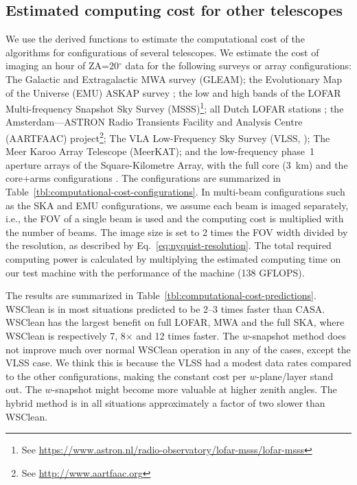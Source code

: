 \documentclass[useAMS,usenatbib]{mn2e}
\newcommand{\degree}{\ensuremath{^{\circ}}\xspace}
\begin{document}
\subsection{Estimated computing cost for other telescopes} \label{sec:application-to-nonmwa}
We use the derived functions to estimate the computational cost of the algorithms for configurations of several telescopes. We estimate the cost of imaging an hour of ZA=20\degree data for the following surveys or array configurations: The Galactic and Extragalactic MWA survey (GLEAM); the Evolutionary Map of the Universe (EMU) ASKAP survey \citep{emu-norris-2011}; the low and high bands of the LOFAR Multi-frequency Snapshot Sky Survey (MSSS)\footnote{See \url{https://www.astron.nl/radio-observatory/lofar-msss/lofar-msss}}; all Dutch LOFAR stations \citep{lofar-2013}; the Amsterdam—ASTRON Radio Transients Facility and Analysis Centre (AARTFAAC) project\footnote{See \url{http://www.aartfaac.org}}; The VLA Low-Frequency Sky Survey (VLSS, \citealt{vlss-2007}); The Meer Karoo Array Telescope (MeerKAT); and the low-frequency phase~1 aperture arrays of the Square-Kilometre Array, with the full core (3~km) and the core+arms configurations \citep{ska-phase1-2013}. The configurations are summarized in Table~\ref{tbl:computational-cost-configurations}. In multi-beam configurations such as the SKA and EMU configurations, we assume each beam is imaged separately, i.e., the FOV of a single beam is used and the computing cost is multiplied with the number of beams. The image size is set to 2 times the FOV width divided by the resolution, as described by Eq.~\ref{eq:nyquist-resolution}. The total required computing power is calculated by multiplying the estimated computing time on our test machine with the performance of the machine (138 GFLOPS).

The results are summarized in Table~\ref{tbl:computational-cost-predictions}. WSClean is in most situations predicted to be 2--3 times faster than CASA. WSClean has the largest benefit on full LOFAR, MWA and the full SKA, where WSClean is respectively 7, 8$\times$ and 12 times faster. The $w$-snapshot method does not improve much over normal WSClean operation in any of the cases, except the VLSS case. We think this is because the VLSS had a modest data rates compared to the other configurations, making the constant cost per $w$-plane/layer stand out. The $w$-snapshot might become more valuable at higher zenith angles. The hybrid method is in all situations approximately a factor of two slower than WSClean.
\end{document}
